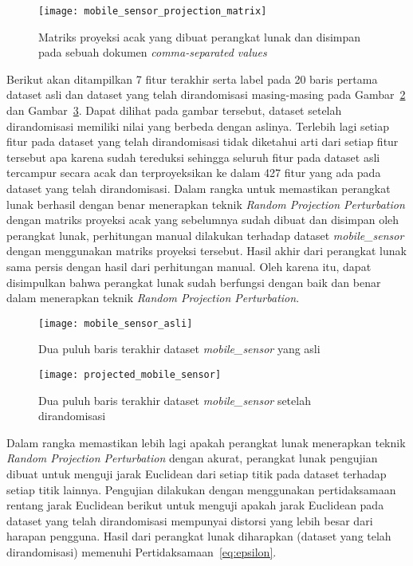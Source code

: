 \begin{figure}
	\centering
	\texttt{[image: mobile\_sensor\_projection\_matrix]}
	\caption{Matriks proyeksi acak yang dibuat perangkat lunak dan disimpan pada sebuah dokumen  \textit{comma-separated values}}
	\label{fig:mobile_sensor_projection_matrix}
\end{figure}

Berikut akan ditampilkan 7 fitur terakhir serta label pada 20 baris pertama dataset asli dan dataset yang telah dirandomisasi masing-masing pada Gambar~\ref{fig:mobile_sensor_asli} dan Gambar~\ref{fig:projected_mobile_sensor}. Dapat dilihat pada gambar tersebut, dataset setelah dirandomisasi memiliki nilai yang berbeda dengan aslinya. Terlebih lagi setiap fitur pada dataset yang telah dirandomisasi tidak diketahui arti dari setiap fitur tersebut apa karena sudah tereduksi sehingga seluruh fitur pada dataset asli tercampur secara acak dan terproyeksikan ke dalam 427 fitur yang ada pada dataset yang telah dirandomisasi. Dalam rangka untuk memastikan perangkat lunak berhasil dengan benar menerapkan teknik \textit{Random Projection Perturbation} dengan matriks proyeksi acak yang sebelumnya sudah dibuat dan disimpan oleh perangkat lunak, perhitungan manual dilakukan terhadap dataset \textit{mobile\_sensor} dengan menggunakan matriks proyeksi tersebut. Hasil akhir dari perangkat lunak sama persis dengan hasil dari perhitungan manual. Oleh karena itu, dapat disimpulkan bahwa perangkat lunak sudah berfungsi dengan baik dan benar dalam menerapkan teknik \textit{Random Projection Perturbation}.

\begin{figure}
	\centering
	\texttt{[image: mobile\_sensor\_asli]}
	\caption{Dua puluh baris terakhir dataset \textit{mobile\_sensor} yang asli}
	\label{fig:mobile_sensor_asli}
\end{figure}

\begin{figure}
	\centering
	\texttt{[image: projected\_mobile\_sensor]}
	\caption{Dua puluh baris terakhir dataset \textit{mobile\_sensor} setelah dirandomisasi}
	\label{fig:projected_mobile_sensor}
\end{figure}

Dalam rangka memastikan lebih lagi apakah perangkat lunak menerapkan teknik \textit{Random Projection Perturbation} dengan akurat, perangkat lunak pengujian dibuat untuk menguji jarak Euclidean dari setiap titik pada dataset terhadap setiap titik lainnya. Pengujian dilakukan dengan menggunakan pertidaksamaan rentang jarak Euclidean berikut untuk menguji apakah jarak Euclidean pada dataset yang telah dirandomisasi mempunyai distorsi yang lebih besar dari harapan pengguna. Hasil dari perangkat lunak diharapkan (dataset yang telah dirandomisasi) memenuhi Pertidaksamaan~\ref{eq:epsilon}.

